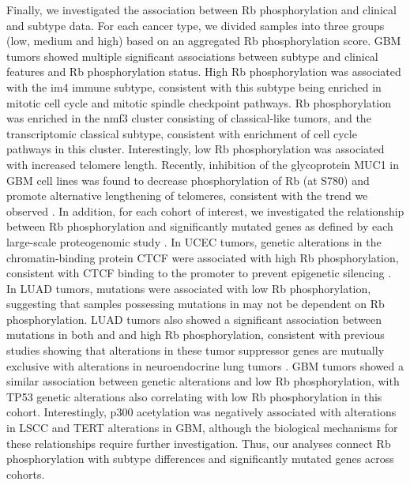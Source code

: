Finally, we investigated the association between Rb phosphorylation and clinical and subtype data. For each cancer type, we divided samples into three groups (low, medium and high) based on an aggregated Rb phosphorylation score. GBM tumors showed multiple significant associations between subtype and clinical features and Rb phosphorylation status. High Rb phosphorylation was associated with the im4 immune subtype, consistent with this subtype being enriched in mitotic cell cycle and mitotic spindle checkpoint pathways. Rb phosphorylation was enriched in the nmf3 cluster consisting of classical-like tumors, and the transcriptomic classical subtype, consistent with enrichment of cell cycle pathways in this cluster. Interestingly, low Rb phosphorylation was associated with increased telomere length. Recently, inhibition of the glycoprotein MUC1 in GBM cell lines was found to decrease phosphorylation of Rb (at S780) and promote alternative lengthening of telomeres, consistent with the trend we observed \cite{kims_parkck:InhibitionMUC12020}. In addition, for each cohort of interest, we investigated the relationship between Rb phosphorylation and significantly mutated genes as defined by each large-scale proteogenomic study \cite{douy_zhaog:CPTACUCEC2020,gillettema_shiz:ProteogenomicCharacterization2020,wanglb_cptac:GBM2021}. In UCEC tumors, genetic alterations in the chromatin-binding protein CTCF were associated with high Rb phosphorylation, consistent with CTCF binding to the  promoter to prevent epigenetic silencing \cite{rosa-velazqueziadl_recillas-targaf:EpigeneticRegulation2007}. In LUAD tumors,  mutations were associated with low Rb phosphorylation, suggesting that samples possessing mutations in  may not be dependent on Rb phosphorylation. LUAD tumors also showed a significant association between mutations in both  and  and high Rb phosphorylation, consistent with previous studies showing that alterations in these tumor suppressor genes are mutually exclusive with  alterations in neuroendocrine lung tumors \cite{georgej_thomasrk:IntegrativeGenomic2018}. GBM tumors showed a similar association between  genetic alterations and low Rb phosphorylation, with TP53 genetic alterations also correlating with low Rb phosphorylation in this cohort. Interestingly, p300 acetylation was negatively associated with  alterations in LSCC and TERT alterations in GBM, although the biological mechanisms for these relationships require further investigation. Thus, our analyses connect Rb phosphorylation with subtype differences and significantly mutated genes across cohorts.


